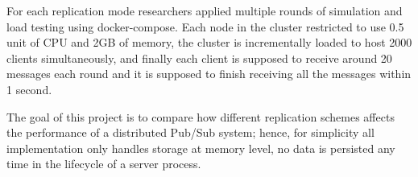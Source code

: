 For each replication mode researchers applied multiple rounds of simulation and load testing using docker-compose\citep{docker-compose}. Each node in the cluster restricted to use 0.5 unit of CPU and 2GB of memory, the cluster is incrementally loaded to host 2000 clients simultaneously, and finally each client is supposed to receive around 20 messages each round and it is supposed to finish receiving all the messages within 1 second. 

The goal of this project is to compare how different replication schemes affects the performance of a distributed Pub/Sub system; hence, for simplicity all implementation only handles storage at memory level, no data is persisted any time in the lifecycle of a server process.
